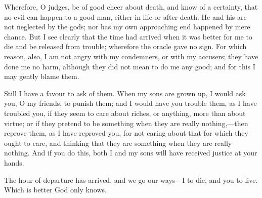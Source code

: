 \documentclass[11pt,letter]{article}
\begin{document}
\par  Wherefore, O judges, be of good cheer about death, and know of a certainty, that no evil can happen to a good man, either in life or after death. He and his are not neglected by the gods; nor has my own approaching end happened by mere chance. But I see clearly that the time had arrived when it was better for me to die and be released from trouble; wherefore the oracle gave no sign. For which reason, also, I am not angry with my condemners, or with my accusers; they have done me no harm, although they did not mean to do me any good; and for this I may gently blame them.

\par  Still I have a favour to ask of them. When my sons are grown up, I would ask you, O my friends, to punish them; and I would have you trouble them, as I have troubled you, if they seem to care about riches, or anything, more than about virtue; or if they pretend to be something when they are really nothing,—then reprove them, as I have reproved you, for not caring about that for which they ought to care, and thinking that they are something when they are really nothing. And if you do this, both I and my sons will have received justice at your hands.

\par  The hour of departure has arrived, and we go our ways—I to die, and you to live. Which is better God only knows.
\end{document}
